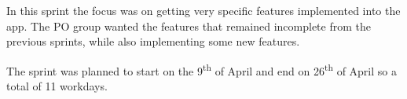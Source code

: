 In this sprint the focus was on getting very specific features implemented into the app.
The PO group wanted the features that remained incomplete from the previous sprints, while also implementing some new features.

The sprint was planned to start on the 9\textsuperscript{th} of April and end on 26\textsuperscript{th} of April so a total of 11 workdays.
